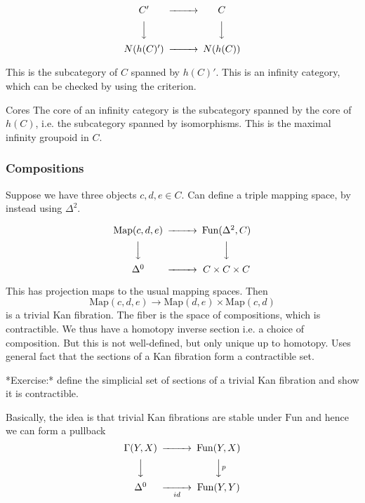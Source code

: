 $$\begin{CD} C' @>>> C\\ @VVV @VVV \\ N(h(C)') @>>> N(h(C)) \end{CD}$$

This is the subcategory of $C$ spanned by $h(C)'$.  This is an infinity category, which can be checked by using the criterion.

\begin{definition}{Cores}{}
    The core of an infinity category is the subcategory spanned by the core of $h(C)$, i.e. the subcategory spanned by isomorphisms. This is the maximal infinity groupoid in $C$.

\end{definition}

\subsubsection{Compositions}

Suppose we have three objects $c,d,e\in C$. Can define a triple mapping space, by instead using $\Delta^2$. 

$$\begin{CD} \mathrm{Map}(c,d,e) @>>> \mathrm{Fun}(\Delta^2, C)\\ @VVV @VVV \\ \Delta^0 @>>> C\times C\times C\end{CD}$$

This has projection maps to the usual mapping spaces. Then $$\mathrm{Map}(c,d,e)\rightarrow \mathrm{Map}(d,e)\times \mathrm{Map}(c,d)$$is a trivial Kan fibration. The fiber is the space of compositions, which is contractible. We thus have a homotopy inverse section i.e. a choice of composition. But this is not well-defined, but only unique up to homotopy. Uses general fact that the sections of a Kan fibration form a contractible set.

*Exercise:* define the simplicial set of sections of a trivial Kan fibration and show it is contractible.

Basically, the idea is that trivial Kan fibrations are stable under $\mathrm{Fun}$ and hence we can form a pullback $$\begin{CD}\Gamma(Y,X)@>>> \mathrm{Fun}(Y,X)\\ @VVV @VVpV \\ \Delta^0 @>>id> \mathrm{Fun}(Y,Y)\end{CD}$$





